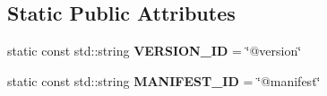\subsection*{Static Public Attributes}
\begin{DoxyCompactItemize}
\item 
\mbox{\label{classAssetsManagerEx_af4d065bbf1c1a5dd79f515f904d02bec}} 
static const std\+::string {\bfseries V\+E\+R\+S\+I\+O\+N\+\_\+\+ID} = \char`\"{}@version\char`\"{}
\item 
\mbox{\label{classAssetsManagerEx_a5070c1706965902b2c40ca54c9a88519}} 
static const std\+::string {\bfseries M\+A\+N\+I\+F\+E\+S\+T\+\_\+\+ID} = \char`\"{}@manifest\char`\"{}
\end{DoxyCompactItemize}
